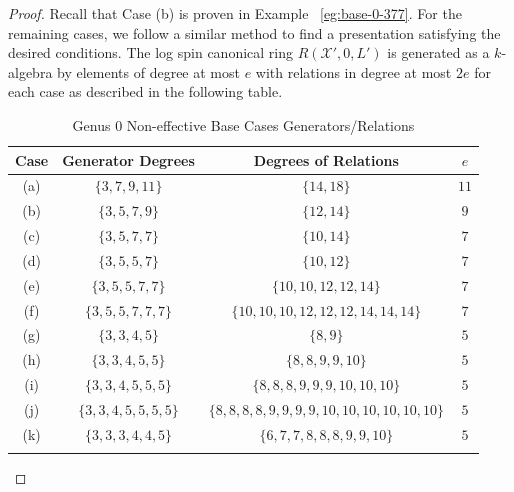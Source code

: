 \documentclass{amsart}
\theoremstyle{plain}
\theoremstyle{definition}
\theoremstyle{remark}
\numberwithin{equation}{section}
\newcommand\sx{\mathscr X}
\begin{document}
\begin{proof}
Recall that Case (b) is proven in Example ~\ref{eg:base-0-377}. For
the remaining cases, we follow a similar method to find a
presentation satisfying the desired conditions. The log spin
canonical ring $R(\sx', 0, L')$ is generated as a $k$-algebra by
elements of degree at most $e$ with relations in degree at most $2e$
for each case as described in the following table.
\begin{longtable}
	{| c || c | c | c |}
	\hline
	Case & Generator Degrees & Degrees of Relations & $e$\\
	\hline
	\hline

	(a) & $\{3, 7, 9, 11\}$ & $\{14, 18\}$ & $11$ \\	\hline

	(b) & $\{3, 5, 7, 9\}$ & $\{12, 14\}$ & $9$ \\ \hline

	(c) & $\{3, 5, 7, 7\}$ & $\{10, 14\}$ & $7$ \\ \hline
	
	(d) & $\{3, 5, 5, 7\}$ & $\{10, 12\}$	& $7$ \\ \hline
	
	(e) & $\{3, 5, 5, 7, 7\}$ & $\{10, 10, 12, 12, 14\}$	& $7$ \\ \hline
	
	(f) & $\{3, 5, 5, 7, 7, 7\}$ & $\{10, 10, 10, 12, 12, 12, 14, 14, 14\}$	& $7$ \\ \hline

	(g) & $\{3, 3, 4, 5\}$ & $\{8, 9\}$ & $5$ \\ \hline
	
	(h) & $\{3, 3, 4, 5, 5\}$ & $\{8, 8, 9, 9, 10\}$ & $5$ \\ \hline
	
	(i) & $\{3, 3, 4, 5, 5, 5\}$ &
	$\{8, 8, 8, 9, 9, 9, 10, 10, 10\}$ & $5$ \\ \hline
	
	(j) & $\{3, 3, 4, 5, 5, 5, 5\}$ &
	$\{8, 8, 8, 8, 9, 9, 9, 9, 10, 10, 10, 10, 10, 10\}$ & $5$ \\ \hline

	(k) &	$\{3, 3, 3, 4, 4, 5\}$ & $\{6, 7, 7, 8, 8, 8, 9, 9, 10\}$ & $5$ \\ \hline
	
	\caption{Genus 0 Non-effective Base Cases Generators/Relations}
	\label{table:g-0-base-cases-degrees}
\end{longtable}


\end{proof}
\end{document}

